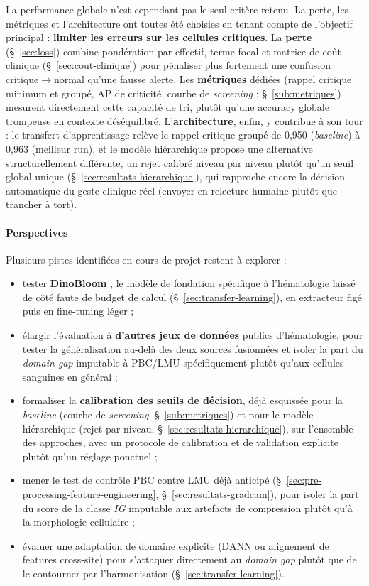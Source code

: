 La performance globale n’est cependant pas le seul critère retenu. La perte, les métriques et l’architecture ont toutes été choisies en tenant compte de l’objectif principal : \textbf{limiter les erreurs sur les cellules critiques}.
La \textbf{perte} (\S~\ref{sec:loss}) combine pondération par effectif, terme focal et matrice de coût clinique (\S~\ref{sec:cout-clinique}) pour pénaliser plus fortement une confusion critique$\to$normal qu'une fausse alerte.
Les \textbf{métriques} dédiées (rappel critique minimum et groupé, AP de criticité, courbe de \emph{screening} ; \S~\ref{sub:metriques}) mesurent directement cette capacité de tri, plutôt qu'une accuracy globale trompeuse en contexte déséquilibré.
L'\textbf{architecture}, enfin, y contribue à son tour : le transfert d'apprentissage relève le rappel critique groupé de 0,950 (\emph{baseline}) à 0,963 (meilleur run), et le modèle hiérarchique propose une alternative structurellement différente, un rejet calibré niveau par niveau plutôt qu'un seuil global unique (\S~\ref{sec:resultats-hierarchique}), qui rapproche encore la décision automatique du geste clinique réel (envoyer en relecture humaine plutôt que trancher à tort).

\paragraph{Perspectives}

Plusieurs pistes identifiées en cours de projet restent à explorer :
\begin{itemize}
  \item tester \textbf{DinoBloom} \parencite{koch2024dinobloom}, le modèle de fondation spécifique à l'hématologie laissé de côté faute de budget de calcul (\S~\ref{sec:transfer-learning}), en extracteur figé puis en fine-tuning léger ;
  \item élargir l'évaluation à \textbf{d'autres jeux de données} publics d'hématologie, pour tester la généralisation au-delà des deux sources fusionnées et isoler la part du \emph{domain gap} imputable à PBC/LMU spécifiquement plutôt qu'aux cellules sanguines en général ;
  \item formaliser la \textbf{calibration des seuils de décision}, déjà esquissée pour la \emph{baseline} (courbe de \emph{screening}, \S~\ref{sub:metriques}) et pour le modèle hiérarchique (rejet par niveau, \S~\ref{sec:resultats-hierarchique}), sur l'ensemble des approches, avec un protocole de calibration et de validation explicite plutôt qu'un réglage ponctuel ;
  \item mener le test de contrôle \og PBC contre LMU \fg{} déjà anticipé (\S~\ref{sec:pre-processing-feature-engineering}, \S~\ref{sec:resultats-gradcam}), pour isoler la part du score de la classe \emph{IG} imputable aux artefacts de compression plutôt qu'à la morphologie cellulaire ;
  \item évaluer une adaptation de domaine explicite (DANN \parencite{ganin2016dann} ou alignement de features cross-site) pour s'attaquer directement au \emph{domain gap} plutôt que de le contourner par l'harmonisation (\S~\ref{sec:transfer-learning}).
\end{itemize}

